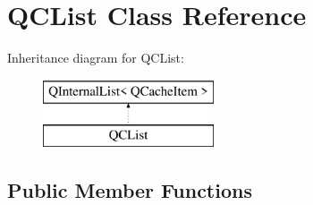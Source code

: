 \hypertarget{class_q_c_list}{}\section{Q\+C\+List Class Reference}
\label{class_q_c_list}
Inheritance diagram for Q\+C\+List\+:\begin{figure}[H]
\begin{center}
\leavevmode
\includegraphics[height=2.000000cm]{class_q_c_list}
\end{center}
\end{figure}
\subsection*{Public Member Functions}
